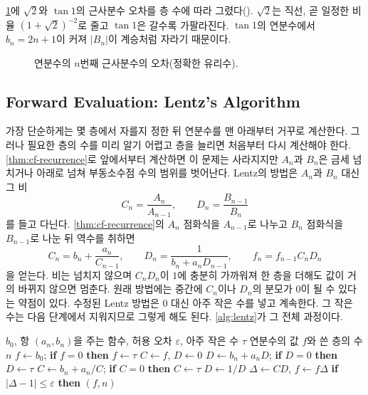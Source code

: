 \cref{fig:convergents}에 $\sqrt2$와 $\tan1$의 근사분수 오차를 층 수에 따라 그렸다(). $\sqrt2$는 직선, 곧 일정한 비율 $(1+\sqrt2)^{-2}$로 줄고 $\tan1$은 갈수록 가팔라진다. $\tan1$의 연분수에서 $b_n=2n+1$이 커져 $|B_n|$이 계승처럼 자라기 때문이다.

\begin{figure}[htbp]
\centering
{}
\caption{연분수의 $n$번째 근사분수의 오차(정확한 유리수).}
\label{fig:convergents}
\end{figure}

\subsection{Forward Evaluation: Lentz's Algorithm}

가장 단순하게는 몇 층에서 자를지 정한 뒤 연분수를 맨 아래부터 거꾸로 계산한다. 그러나 필요한 층의 수를 미리 알기 어렵고 층을 늘리면 처음부터 다시 계산해야 한다. \cref{thm:cf-recurrence}로 앞에서부터 계산하면 이 문제는 사라지지만 $A_n$과 $B_n$은 금세 넘치거나 아래로 넘쳐 부동소수점 수의 범위를 벗어난다. Lentz의 방법은 $A_n$과 $B_n$ 대신 그 비
\[
C_n=\frac{A_n}{A_{n-1}},\qquad D_n=\frac{B_{n-1}}{B_n}
\]
를 들고 다닌다\cite{lentz1976}. \cref{thm:cf-recurrence}의 $A_n$ 점화식을 $A_{n-1}$로 나누고 $B_n$ 점화식을 $B_{n-1}$로 나눈 뒤 역수를 취하면
\[
C_n=b_n+\frac{a_n}{C_{n-1}},\qquad D_n=\frac{1}{b_n+a_nD_{n-1}},\qquad f_n=f_{n-1}C_nD_n
\]
을 얻는다. 비는 넘치지 않으며 $C_nD_n$이 $1$에 충분히 가까워져 한 층을 더해도 값이 거의 바뀌지 않으면 멈춘다. 원래 방법에는 중간에 $C_n$이나 $D_n$의 분모가 $0$이 될 수 있다는 약점이 있다. 수정된 Lentz 방법은 $0$ 대신 아주 작은 수를 넣고 계속한다. 그 작은 수는 다음 단계에서 지워지므로 그렇게 해도 된다\cite{thompson1986coulomb,press2007nr}. \cref{alg:lentz}가 그 전체 과정이다.

\begin{algorithm}[htbp]
\begin{algorithmic}[1]
\Require $b_0$, 항 $(a_n,b_n)$을 주는 함수, 허용 오차 $\varepsilon$, 아주 작은 수 $\tau$
\Ensure 연분수의 값 $f$와 쓴 층의 수 $n$
\State $f\gets b_0$; \textbf{if} $f=0$ \textbf{then} $f\gets\tau$
\State $C\gets f$, $D\gets0$
  \State $D\gets b_n+a_nD$; \textbf{if} $D=0$ \textbf{then} $D\gets\tau$
  \State $C\gets b_n+a_n/C$; \textbf{if} $C=0$ \textbf{then} $C\gets\tau$
  \State $D\gets1/D$
  \State $\Delta\gets CD$, $f\gets f\Delta$ 
  \State \textbf{if} $|\Delta-1|\le\varepsilon$ \textbf{then} \Return $(f,n)$
\EndFor
\end{algorithmic}
\caption{수정된 Lentz 알고리즘 (stardust 의 )}
\label{alg:lentz}
\end{algorithm}

